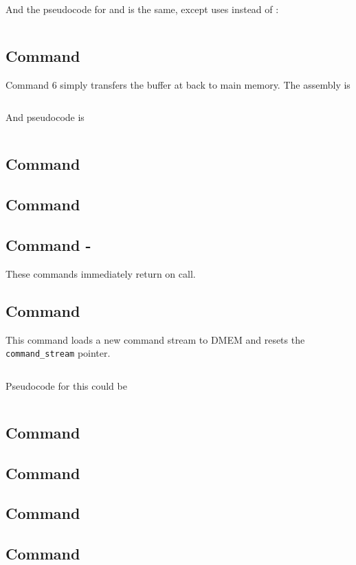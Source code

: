 \inputminted[fontsize=\small]{asm}{../ucode/command_4.asm}

And the pseudocode for  and  is the same, except  uses  instead of :

\inputminted{c}{../ucode/command_459.c}

\subsection{Command }
Command 6 simply transfers the buffer at  back to main memory. The assembly is 

\inputminted[fontsize=\small]{asm}{../ucode/command_6.asm}

And pseudocode is

\inputminted{c}{../ucode/command_6.c}

\subsection{Command }
\subsection{Command }
\subsection{Command  - }
These commands immediately return on call.
\subsection{Command }
This command loads a new command stream to DMEM and resets the \texttt{command_stream} pointer. 

\inputminted[fontsize=\small]{asm}{../ucode/command_d.asm}

Pseudocode for this could be 

\inputminted{c}{../ucode/command_d.c}

\subsection{Command }
\subsection{Command }
\subsection{Command }
\subsection{Command }